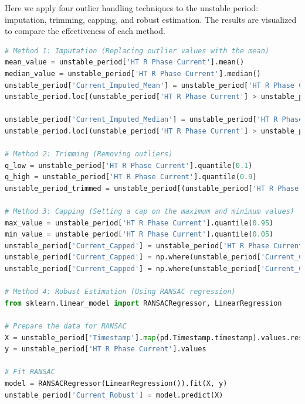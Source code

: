 Here we apply four outlier handling techniques to the unstable period: imputation, trimming, capping, and robust estimation. The results are visualized to compare the effectiveness of each method.

\begin{lstlisting}[language=Python, gobble=0]
# Method 1: Imputation (Replacing outlier values with the mean)
mean_value = unstable_period['HT R Phase Current'].mean()
median_value = unstable_period['HT R Phase Current'].median()
unstable_period['Current_Imputed_Mean'] = unstable_period['HT R Phase Current'].copy()
unstable_period.loc[(unstable_period['HT R Phase Current'] > unstable_period['HT R Phase Current'].quantile(0.95)) | (unstable_period['HT R Phase Current'] < unstable_period['HT R Phase Current'].quantile(0.05)), 'Current_Imputed_Mean'] = mean_value

unstable_period['Current_Imputed_Median'] = unstable_period['HT R Phase Current'].copy()
unstable_period.loc[(unstable_period['HT R Phase Current'] > unstable_period['HT R Phase Current'].quantile(0.95)) | (unstable_period['HT R Phase Current'] < unstable_period['HT R Phase Current'].quantile(0.05)), 'Current_Imputed_Median'] = median_value

# Method 2: Trimming (Removing outliers)
q_low = unstable_period['HT R Phase Current'].quantile(0.1)
q_high = unstable_period['HT R Phase Current'].quantile(0.9)
unstable_period_trimmed = unstable_period[(unstable_period['HT R Phase Current'] >= q_low) & (unstable_period['HT R Phase Current'] <= q_high)]

# Method 3: Capping (Setting a cap on the maximum and minimum values)
max_value = unstable_period['HT R Phase Current'].quantile(0.95)
min_value = unstable_period['HT R Phase Current'].quantile(0.05)
unstable_period['Current_Capped'] = unstable_period['HT R Phase Current'].copy()
unstable_period['Current_Capped'] = np.where(unstable_period['Current_Capped'] > max_value, max_value, unstable_period['Current_Capped'])
unstable_period['Current_Capped'] = np.where(unstable_period['Current_Capped'] < min_value, min_value, unstable_period['Current_Capped'])

# Method 4: Robust Estimation (Using RANSAC regression)
from sklearn.linear_model import RANSACRegressor, LinearRegression

# Prepare the data for RANSAC
X = unstable_period['Timestamp'].map(pd.Timestamp.timestamp).values.reshape(-1, 1)  # Convert datetime to timestamp
y = unstable_period['HT R Phase Current'].values

# Fit RANSAC
model = RANSACRegressor(LinearRegression()).fit(X, y)
unstable_period['Current_Robust'] = model.predict(X)
\end{lstlisting}

